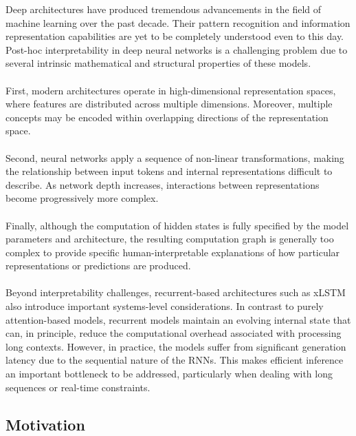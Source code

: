 Deep architectures have produced tremendous advancements in the field of machine learning over the past decade. 
Their pattern recognition and information representation capabilities are yet to be completely understood even to this day.
Post-hoc interpretability in deep neural networks is a challenging problem due to several intrinsic mathematical 
and structural properties of these models. \\ \\
%
First, modern architectures operate in high-dimensional representation spaces, 
where features are distributed across multiple dimensions. Moreover, multiple concepts may be encoded within 
overlapping directions of the representation space. \\ \\
%
Second, neural networks apply a sequence of non-linear transformations, making the relationship between input tokens 
and internal representations difficult to describe. As network depth increases, interactions 
between representations become progressively more complex. \\ \\ 
%
Finally, although the computation of hidden states is fully 
specified by the model parameters and architecture, the resulting computation graph is generally too complex to provide 
specific human-interpretable explanations of how particular representations or predictions are produced. \\ \\
%
Beyond interpretability challenges, recurrent-based architectures such as xLSTM also introduce important systems-level 
considerations. In contrast to purely attention-based models, recurrent models maintain an evolving internal state that 
can, in principle, reduce the computational overhead associated with processing long contexts. However, in practice, 
the models suffer from significant generation latency due to the sequential nature of the RNNs. 
This makes efficient inference an important bottleneck to be addressed, particularly when dealing with long sequences or real-time constraints. 

\subsection{Motivation}

